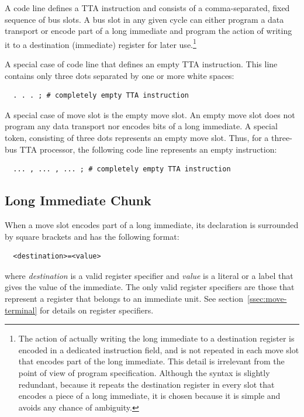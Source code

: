 \documentclass[a4paper,twoside]{tceusermanual}
\begin{document}
A code line defines a TTA instruction and consists of a comma-separated,
fixed sequence of bus slots.  A bus slot in any given cycle can either
program a data transport or encode part of a long immediate and program the
action of writing it to a destination (immediate) register for later
use.\footnote{
%
  The action of actually writing the long immediate to a destination
  register is encoded in a dedicated instruction field, and is not repeated
  in each move slot that encodes part of the long immediate.  This detail is
  irrelevant from the point of view of program specification.  Although the
  syntax is slightly redundant, because it repeats the destination register
  in every slot that encodes a piece of a long immediate, it is chosen
  because it is simple and avoids any chance of ambiguity.}

A special case of code line that defines an empty TTA instruction. This line
contains only three dots separated by one or more white spaces:
\begin{verbatim}
  . . . ; # completely empty TTA instruction
\end{verbatim}

A special case of move slot is the empty move slot. An empty move slot does
not program any data transport nor encodes bits of a long immediate. A
special token, consisting of three dots represents an empty move slot.
Thus, for a three-bus TTA processor, the following code line represents an
empty instruction:
\begin{verbatim}
  ... , ... , ... ; # completely empty TTA instruction
\end{verbatim}

\subsection{Long Immediate Chunk}

When a move slot encodes part of a long immediate, its declaration is
surrounded by square brackets and has the following format:

\begin{verbatim}
  <destination>=<value>
\end{verbatim}

where \emph{destination} is a valid register specifier and \emph{value} is a
literal or a label that gives the value of the immediate.  The only valid
register specifiers are those that represent a register that belongs to an
immediate unit.  See section~\ref{ssec:move-terminal} for details on
register specifiers.
\end{document}
